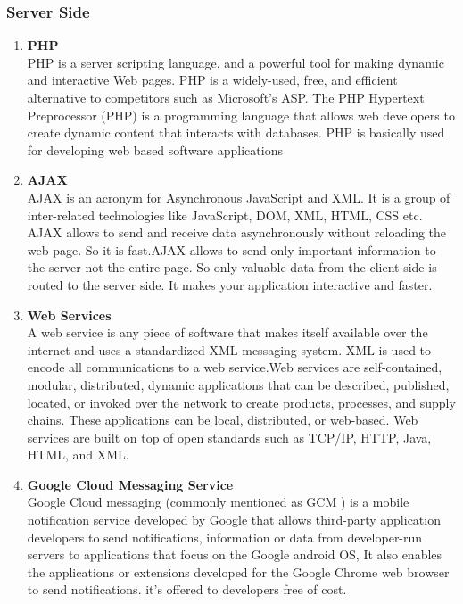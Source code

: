 \documentclass[12pt, a4paper]{article}
\begin{document}
\subsubsection{Server Side	}

\begin{enumerate}[leftmargin=1.5cm]
\item \textbf{PHP}\\PHP is a server scripting language, and a powerful tool for making dynamic and interactive Web pages.
PHP is a widely-used, free, and efficient alternative to competitors such as Microsoft's ASP.
The PHP Hypertext Preprocessor (PHP) is a programming language that allows web developers to create dynamic content that interacts with databases. PHP is basically used for developing web based software applications
\item \textbf{AJAX}\\AJAX is an acronym for Asynchronous JavaScript and XML. It is a group of inter-related technologies like JavaScript, DOM, XML, HTML, CSS etc.
AJAX allows to send and receive data asynchronously without reloading the web page. So it is fast.AJAX allows to send only important information to the server not the entire page. So only valuable data from the client side is routed to the server side. It makes your application interactive and faster.
\item \textbf{Web Services}\\A web service is any piece of software that makes itself available over the internet and uses a standardized XML messaging system. XML is used to encode all communications to a web service.Web services are self-contained, modular, distributed, dynamic applications that can be described, published, located, or invoked over the network to create products, processes, and supply chains. These applications can be local, distributed, or web-based. Web services are built on top of open standards such as TCP/IP, HTTP, Java, HTML, and XML.
\item \textbf{Google Cloud Messaging Service}\\Google Cloud messaging (commonly mentioned as GCM ) is a mobile notification service developed by Google that allows third-party application developers to send notifications, information or data from developer-run servers to applications that focus on the Google android OS, It also enables the applications or extensions developed for the Google Chrome web browser to send notifications. it's offered to developers free of cost.

\end{enumerate}
\end{document}
